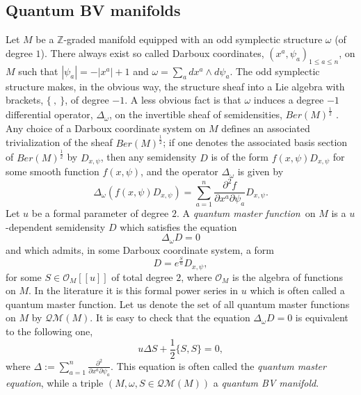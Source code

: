 \documentclass{amsart}
\theoremstyle{plain}
\theoremstyle{definition}
\begin{document}
\subsection{Quantum BV manifolds} Let $M$ be a ${{\mathbb Z}}$-graded manifold equipped with an odd symplectic structure ${\omega}$ (of degree $1$). There always exist so called Darboux coordinates,
$(x^a, \psi_a)_{1\leq a\leq n}$, on $M$ such that $|\psi_a|=-|x^a| + 1$ and ${\omega}=\sum_a dx^a\wedge d\psi_a$. The odd symplectic structure makes, in the obvious way, the structure sheaf  
into a Lie algebra with brackets, $\{\ ,\ \}$, of degree $-1$. A less obvious fact is that ${\omega}$ induces
a  degree $-1$ differential operator, $\Delta_{\omega}$, on the invertible sheaf of semidensities, ${{\mathit B}{\mathit e} {\mathit r}}(M)^{\frac{1}{2}}$ \cite{Kh}. Any choice of a Darboux coordinate system on $M$ defines an associated trivialization of the sheaf ${{\mathit B}{\mathit e} {\mathit r}}(M)^{\frac{1}{2}}$; if one denotes the associated basis section
of  ${{\mathit B}{\mathit e} {\mathit r}}(M)^{\frac{1}{2}}$ by $D_{x,\psi}$, then  any semidensity $D$ is of the form $f(x,\psi) D_{x,\psi}$ for some smooth function $f(x,\psi)$, and the operator $\Delta_{\omega}$ is given by
 $$
 \Delta_\omega\left(f(x,\psi) D_{x,\psi}\right)=\sum_{a=1}^n 
  \frac{{{\partial}}^2f}{{{\partial}} x^a {{\partial}} \psi_a} D_{x,\psi}.
 $$
Let ${u}$ be a formal parameter of degree $2$. A {\em quantum
master function}\ on $M$ is a ${u}$-dependent semidensity $D$ which satisfies the equation
$$
\Delta_\omega D=0
$$
and which admits, in some Darboux coordinate system, a form
$$
D=e^{\frac{S}{u}}D_{x,\psi},
$$
for some  $S\in {{\mathcal O}}_M[[{u}]]$ of total degree $2$, where ${{\mathcal O}}_M$ is the algebra of functions on $M$. In the literature it is this formal power series
in ${u}$ which is often called a quantum master function. Let us denote the set of all quantum master functions on $M$ by ${{\mathcal Q}}{{\mathcal M}}(M)$. It is easy to check that the equation $\Delta_{\omega} D=0$ is equivalent to the following one,
\begin{equation}\label{3:QME}
{u}\Delta S + \frac{1}{2}\{S,S\}=0,
\end{equation}
where $\Delta:=\sum_{a=1}^n  \frac{{{\partial}}^2}{{{\partial}} x^a {{\partial}} \psi_a}$. This equation is often called the {\em quantum master equation}, while a triple $(M, {\omega}, S\in {{\mathcal Q}}{{\mathcal M}}(M))$ a {\em quantum BV manifold}.

{\smallskip}
\end{document}
